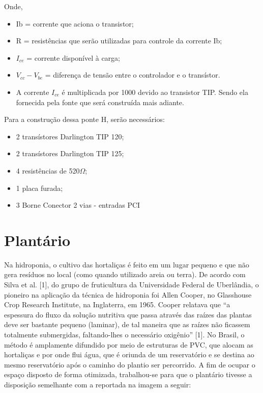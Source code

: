 Onde,
\begin{itemize}

	\item Ib = corrente que aciona o transistor;
	
	\item R = resistências que serão utilizadas para controle da corrente Ib;
	
	\item $I_{ce}$ = corrente disponível à carga;
	
	\item ${V_{cc} - V_{be}}$ = diferença de tensão entre o controlador e o transístor.
	
	\item A corrente $I_{ce}$ é multiplicada por 1000 devido ao transistor TIP. Sendo ela fornecida pela fonte que será construída mais adiante.
	
\end{itemize}

Para a construção dessa ponte H, serão necessários:
\begin{itemize}

\item 2 transístores Darlington TIP 120;
\item 2 transístores Darlington TIP 125;
\item 4 resistências de 520$\Omega$;
\item 1 placa furada;
\item 3 Borne Conector 2 vias - entradas PCI

\end{itemize}

\section{Plantário}

Na hidroponia, o cultivo das hortaliças é feito em um lugar pequeno e que não gera resíduos no local (como quando utilizado areia ou terra). De acordo com Silva et al. [1], do grupo de fruticultura da Universidade Federal de Uberlândia, o pioneiro na aplicação da técnica de hidroponia foi Allen Cooper, no Glasshouse Crop Research Institute, na Inglaterra, em 1965. Cooper relatava que “a espessura do fluxo da solução nutritiva que passa através das raízes das plantas deve ser bastante pequeno (laminar), de tal maneira que as raízes não ficassem totalmente submergidas, faltando-lhes o necessário oxigênio” [1]. No Brasil, o método é amplamente difundido por meio de estruturas de PVC, que alocam as hortaliças e por onde flui água, que é oriunda de um reservatório e se destina ao mesmo reservatório após o caminho do plantio ser percorrido. A fim de ocupar o espaço disposto de forma otimizada, trabalhou-se para que o plantário tivesse a disposição semelhante com a reportada na imagem a seguir:

